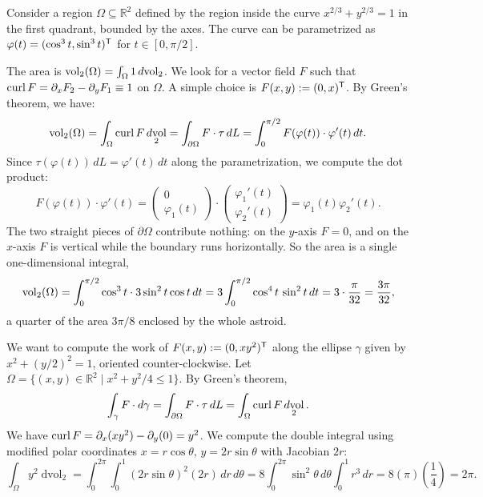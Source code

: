 \begin{example}
\label{ex:area_greens_theorem}
Consider a region $\Omega \subseteq \mathbb{R}^2$ defined by the region inside the curve $x^{2/3} + y^{2/3} = 1$ in the first quadrant, bounded by the axes. The curve can be parametrized as $\varphi(t) = (\cos^3 t, \sin^3 t)^{\mathsf{T}}$ for $t \in [0, \pi/2]$.

The area is $\operatorname{vol}_2(\Omega) = \int_\Omega 1 \mathop{d\text{vol}}_2$. We look for a vector field $F$ such that $\operatorname{curl} F = \partial_x F_2 - \partial_y F_1 \equiv 1$ on $\Omega$. A simple choice is $F(x,y) := (0, x)^{\mathsf{T}}$.
By Green's theorem, we have:
\[\operatorname{vol}_2(\Omega) = \int_\Omega \operatorname{curl} F \mathop{d\text{vol}}_2 = \int_{\partial\Omega} F \cdot \tau \,dL = \int_0^{\pi/2} F(\varphi(t)) \cdot \varphi'(t) \,dt.\]
Since $\tau(\varphi(t)) \,dL = \varphi'(t) \,dt$ along the parametrization, we compute the dot product:
\[F(\varphi(t)) \cdot \varphi'(t) = \begin{pmatrix} 0 \\ \varphi_1(t) \end{pmatrix} \cdot \begin{pmatrix} \varphi_1'(t) \\ \varphi_2'(t) \end{pmatrix} = \varphi_1(t)\varphi_2'(t).\]
The two straight pieces of $\partial\Omega$ contribute nothing: on the $y$-axis $F = 0$, and on the
$x$-axis $F$ is vertical while the boundary runs horizontally. So the area is a single
one-dimensional integral,
\[\operatorname{vol}_2(\Omega) = \int_0^{\pi/2} \cos^3t\cdot 3\sin^2t\cos t\,dt
  = 3\int_0^{\pi/2}\cos^4t\,\sin^2t\,dt = 3\cdot\frac{\pi}{32} = \frac{3\pi}{32},\]
a quarter of the area $3\pi/8$ enclosed by the whole astroid.
\end{example}

\begin{example}
\label{ex:line_integral_greens}
We want to compute the work of $F(x,y) := (0, xy^2)^{\mathsf{T}}$ along the ellipse $\gamma$ given by $x^2 + (y/2)^2 = 1$, oriented counter-clockwise.
Let $\Omega = \{(x,y) \in \mathbb{R}^2 \mid x^2 + y^2/4 \leq 1\}$. By Green's theorem,
\[\int_\gamma F \cdot d\gamma = \int_{\partial\Omega} F \cdot \tau \,dL = \int_\Omega \operatorname{curl} F \mathop{d\text{vol}}_2.\]
We have $\operatorname{curl} F = \partial_x(xy^2) - \partial_y(0) = y^2$. We compute the double integral using modified polar coordinates $x = r \cos \theta$, $y = 2r \sin \theta$ with Jacobian $2r$:
\[\int_\Omega y^2 \mathop{d\text{vol}}_2 = \int_0^{2\pi} \int_0^1 (2r \sin\theta)^2 (2r) \,dr\,d\theta = 8 \int_0^{2\pi} \sin^2\theta \,d\theta \int_0^1 r^3 \,dr = 8 (\pi) \left(\frac{1}{4}\right) = 2\pi.\]
\end{example}

